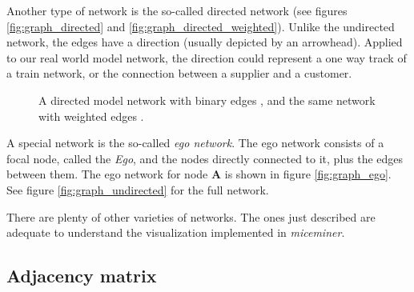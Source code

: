 Another type of network is the so-called directed network (see figures \ref{fig:graph_directed} and \ref{fig:graph_directed_weighted}). Unlike the undirected network, the edges have a direction (usually depicted by an arrowhead). Applied to our real world model network, the direction could represent a one way track of a train network, or the connection between a supplier and a customer.  

\begin{figure}[htpb]%
	\centering 
	\qquad 
	\caption[Directed model network with binary and weighted edges]{A directed model network with binary edges , and the same network with weighted edges .} 

\end{figure}

A special network is the so-called \textit{ego network}. The ego network consists of a focal node, called the \textit{Ego}, and the nodes directly connected to it, plus the edges between them. The ego network for node \textbf{A} is shown in figure \ref{fig:graph_ego}. See figure \ref{fig:graph_undirected} for the full network. 

There are plenty of other varieties of networks. The ones just described are adequate to understand the visualization implemented in \textit{miceminer}.

\subsection{Adjacency matrix}
\label{subsec:adjacency_matrix}

